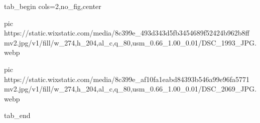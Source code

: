  
 
 
 
 

\ifcmt
  tab_begin cols=2,no_fig,center

     pic https://static.wixstatic.com/media/8c399e_493d343d5fb3454689f52424b962b8ff~mv2.jpg/v1/fill/w_274,h_204,al_c,q_80,usm_0.66_1.00_0.01/DSC_1993_JPG.webp

		 pic https://static.wixstatic.com/media/8c399e_af10fa1eabd84393b546a99e96fa5771~mv2.jpg/v1/fill/w_274,h_204,al_c,q_80,usm_0.66_1.00_0.01/DSC_2069_JPG.webp

  tab_end
\fi
